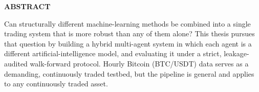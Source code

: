 
\begin{center}

\end{center}

\begin{center}
{{\bf\fontsize{14pt}{14.5pt}\selectfont \uppercase{ABSTRACT}}}
\end{center}

\doublespacing
{}







Can structurally different machine-learning methods be combined into a single trading system that is more robust than any of them alone? This thesis pursues that question by building a hybrid multi-agent system in which each agent is a different artificial-intelligence model, and evaluating it under a strict, leakage-audited walk-forward protocol. Hourly Bitcoin (BTC/USDT) data serves as a demanding, continuously traded testbed, but the pipeline is general and applies to any continuously traded asset.


